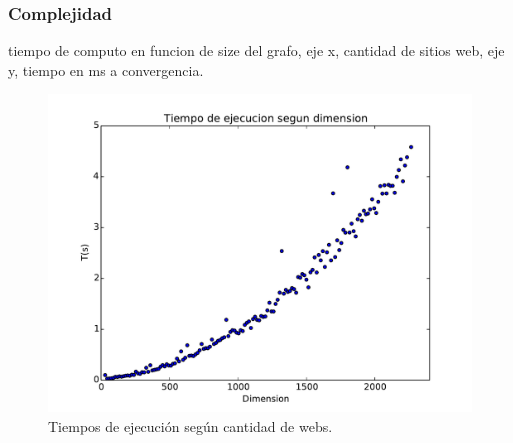 \subsubsection{Complejidad}
tiempo de computo en funcion de size del grafo, eje x, cantidad de sitios web, eje y, tiempo en ms a convergencia.

\begin{figure}[H]
\centering
\includegraphics[scale=0.7]{images/complejidad.pdf}
\caption{Tiempos de ejecución según cantidad de webs.}
\label{timePageRank}
\end{figure}